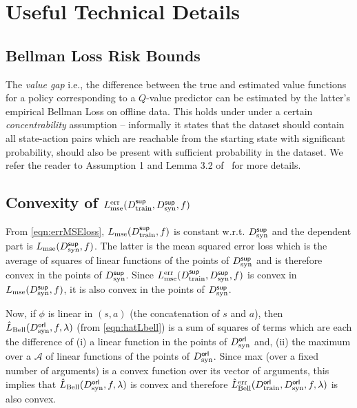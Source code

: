 \documentclass{article}
\theoremstyle{plain}
\theoremstyle{definition}
\theoremstyle{remark}
\newcommand{\mc}[1]{\ensuremath{\mathcal{#1}}\xspace}
\newcommand{\tn}[1]{\ensuremath{\textnormal{#1}}\xspace}
\begin{document}







\newpage



\newpage
\appendix










\section{Useful Technical Details}
\subsection{Bellman Loss Risk Bounds}\label{app:misc1}
The \emph{value gap} i.e., the difference between the true and estimated value functions for a policy corresponding to a $Q$-value predictor can be 
estimated by the latter's empirical Bellman Loss on offline data. This holds under under a certain \emph{concentrability} assumption -- informally it states that the dataset should contain all state-action pairs which are reachable from the starting state with significant probability, should also be present with sufficient probability in the dataset. We refer the reader to Assumption 1 and Lemma 3.2 of~\citep{duan21a} for more details.

\subsection{Convexity of $L^{\tn{err}}_{\tn{mse}}(D^{\sf sup}_{\tn{train}}, D^{\sf sup}_{\tn{syn}}, f)$}\label{app:misc2}
From \eqref{eqn:errMSEloss}, $L_{\tn{mse}}(D^{\sf sup}_{\tn{train}}, f)$ is constant w.r.t. $D^{\sf sup}_{\tn{syn}}$ and the dependent part is  $L_{\tn{mse}}(D^{\sf sup}_{\tn{syn}}, f)$. The latter is the mean squared error loss which is the average of squares of linear functions of the points of  $D^{\sf sup}_{\tn{syn}}$ and is therefore convex in the points of $D^{\sf sup}_{\tn{syn}}$. Since $L^{\tn{err}}_{\tn{mse}}(D^{\sf sup}_{\tn{train}}, D^{\sf sup}_{\tn{syn}}, f)$ is convex in $L_{\tn{mse}}(D^{\sf sup}_{\tn{syn}}, f)$, it is also convex in the points of $D^{\sf sup}_{\tn{syn}}$.


Now, if $\phi$ is linear in $(s,a)$ (the concatenation of $s$ and $a$), then $\hat{L}_{\tn{Bell}}(D^{\sf orl}_{\tn{syn}}, f, \lambda)$ (from \eqref{eqn:hatLbell}) is a sum of squares of terms which are each the difference of (i) a linear function in the points of  $D^{\sf orl}_{\tn{syn}}$ and, (ii) the maximum over a $\mc{A}$ of linear functions of  the points of  $D^{\sf orl}_{\tn{syn}}$. Since max (over a fixed number of arguments) is a convex function over its vector of arguments, this implies that $\hat{L}_{\tn{Bell}}(D^{\sf orl}_{\tn{syn}}, f, \lambda)$ is convex and therefore $\hat{L}^{\tn{err}}_{\tn{Bell}}(D^{\sf orl}_{\tn{train}}, D^{\sf orl}_{\tn{syn}}, f, \lambda)$ is also convex.



\end{document}
